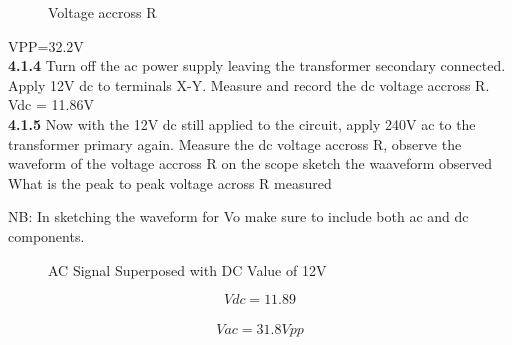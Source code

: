 \begin{figure}[H]
    \centering
    \caption{Voltage accross R}
    \label{fig:ac_signal}
\end{figure}
VPP=32.2V \\


\textbf{4.1.4} Turn off the ac power supply leaving the transformer secondary connected. Apply 12V dc to terminals X-Y. Measure and record the  dc voltage accross R. \\
Vdc = 11.86V \\
\textbf{4.1.5} Now with the 12V dc still applied to the circuit, apply 240V ac to the transformer primary again. Measure the dc voltage accross R, observe the waveform of the voltage accross R on the scope sketch the waaveform observed What is the peak to peak voltage across R measured

NB: In sketching the waveform for Vo make sure to include both ac and dc components. \\

\begin{figure}[H]
    \centering
    \caption{AC Signal Superposed with DC Value of 12V}
    \label{fig:ac_dc_signal}
\end{figure}
$$Vdc=11.89$$ \\
$$Vac=31.8Vpp$$ \\

